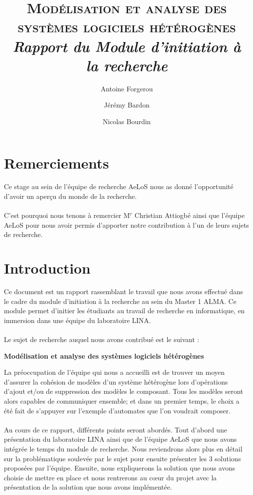 \documentclass[12pt,a4paper]{report}
\title{\textsc{Modélisation et analyse des systèmes logiciels hétérogènes}\vspace{0.5cm}\\\large{\textit{Rapport du Module d'initiation à la recherche}}}
\author{Antoine Forgerou \and Jérémy Bardon \and Nicolas Bourdin}
\date{}
\begin{document}
	\renewcommand{\contentsname}{Sommaire}

	\maketitle	

\chapter*{Remerciements}
Ce stage au sein de l'équipe de recherche AeLoS nous as donné
l'opportunité d'avoir un aperçu du monde de la recherche. 
\\\\
C'est pourquoi nous tenons à remercier M$^r$ Christian Attiogbé 
ainsi que l'équipe AeLoS pour nous avoir permis d'apporter notre
contribution à l'un de leurs sujets de recherche.

\newpage

	\tableofcontents	
	\newpage

	\setlength{\unitlength}{1cm}
	\setcounter{page}{1}
\nocite{*}
\chapter{Introduction}
Ce document est un rapport rassemblant le travail que nous avons effectué dans le cadre du module 
d'initiation à la recherche au sein du Master 1 ALMA. Ce module permet d'initier 
les étudiants au travail de recherche en informatique, en immersion dans une équipe
du laboratoire LINA. 
\\\\
Le sujet de recherche auquel nous avons contribué est le suivant : 

\begin{center}
	  \textbf{Modélisation et analyse des systèmes logiciels hétérogènes}
\end{center}

La préoccupation de l'équipe qui nous a accueilli est de trouver un moyen d'assurer la cohésion 
de modèles d'un système
hétérogène lors d'opérations d'ajout et/ou de suppression des modèles le composant. 
Tous les modèles seront alors capables de communiquer ensemble; et dans un premier temps, 
le choix a été fait de s'appuyer sur l'exemple d'automates que l'on voudrait composer.
\\\\
Au cours de ce rapport, différents points seront abordés. Tout d'abord une 
présentation du laboratoire LINA ainsi que de l'équipe AeLoS que nous avons intégrée le 
temps du module de recherche. Nous reviendrons alors plus en détail sur la 
problématique soulevée par le sujet pour ensuite présenter les 3 solutions proposées
par l'équipe. Ensuite, nous expliquerons la solution que nous avons choisie de mettre 
en place et nous rentrerons au cœur du projet avec la présentation de la solution
que nous avons implémentée.	
\end{document}
